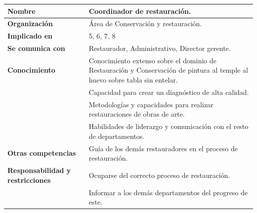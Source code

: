 \documentclass[a4paper,11pt]{article}
\begin{document}
			\begin{center}
				\begin{tabular}{| l | p{5.5cm} |}
					\hline
					\cellcolor[RGB]{224,233,250}\textbf{Nombre} & Coordinador de
					restauración.\\
					\hline
					\cellcolor[RGB]{224,233,250}\textbf{Organización} & Área de Conservación y
					restauración.\\
					\hline
					\cellcolor[RGB]{224,233,250}\textbf{Implicado en} & 5, 6, 7, 8\\
					\hline
					\cellcolor[RGB]{224,233,250}\textbf{Se comunica con} & Restaurador,
					Administrativo, Director gerente.\\
					\hline
					\cellcolor[RGB]{224,233,250}\textbf{Conocimiento} & Conocimiento extenso
					sobre el dominio de Restauración y Conservación de pintura al temple al huevo sobre tabla sin entelar.\\
					\cellcolor[RGB]{224,233,250}& Capacidad para crear un diagnóstico de alta
					calidad.\\
					\cellcolor[RGB]{224,233,250}& Metodologías y capacidades para realizar
					restauraciones de obras de arte.\\
					\cellcolor[RGB]{224,233,250}& Habilidades de liderazgo y comunicación con
					el resto de departamentos.\\
					\hline
					\cellcolor[RGB]{224,233,250}\textbf{Otras competencias} & Guía de los demás
					restauradores en el proceso de restauración.\\
					\hline
					\cellcolor[RGB]{224,233,250}\textbf{Responsabilidad y restricciones} &
					Ocuparse del correcto proceso de restauración.\\
					\cellcolor[RGB]{224,233,250}& Informar a los demás departamentos del
					progreso de este.\\
					\hline
				\end{tabular}
			\end{center}
\end{document}
